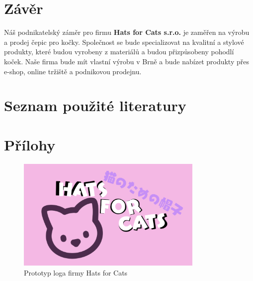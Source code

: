 \documentclass[12pt, a4paper]{article}
\begin{document}
\section{Závěr}

Náš podnikatelský záměr pro firmu \textbf{Hats for Cats s.r.o.} je zaměřen na výrobu a prodej čepic pro kočky.
Společnost se bude specializovat na kvalitní a stylové produkty, které budou vyrobeny z materiálů a budou přizpůsobeny pohodlí koček.
Naše firma bude mít vlastní výrobu v Brně a bude nabízet produkty přes e-shop, online tržiště a podnikovou prodejnu.

\section{Seznam použité literatury}
\printbibliography[heading=none]
\section{Přílohy}

\begin{figure}[h]
  \centering
  \includegraphics[width=0.8\textwidth]{files/logo.png}
  \caption{Prototyp loga firmy Hats for Cats}
\end{figure}

\listoftables
\end{document}

